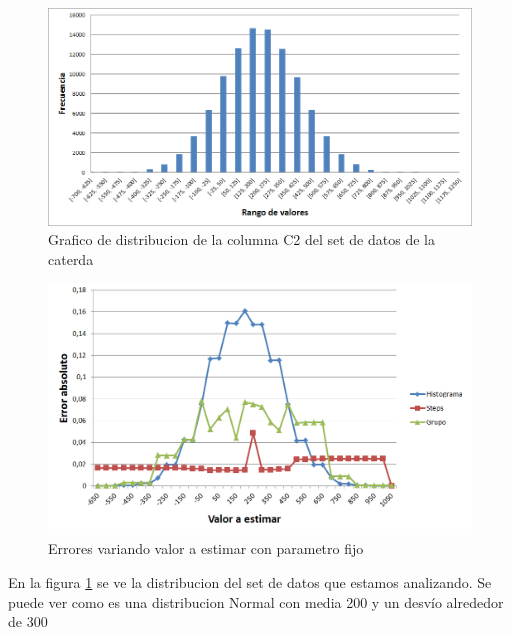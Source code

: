 \documentclass[10pt, a4paper]{article}
\begin{document}
	\begin{figure}[H]
	  \begin{center}
	    \includegraphics[scale=.50]{imagenes/distro_C2.png}
	    \caption{Grafico de distribucion de la columna C2 del set de datos de la caterda} 
	    \label{fig:(distro_C2}
	  \end{center}
	\end{figure}

		\newpage					
	\begin{figure}[H]
	  \begin{center}
	    \includegraphics[scale=.40]{imagenes/C2_variando_valor.png}
	    \caption{Errores variando valor a estimar con parametro fijo} 
	    \label{fig:C2_variando_valor}
	  \end{center}
	\end{figure}
		
		En la figura \ref{fig:(distro_C2} se ve la distribucion del set de datos que estamos analizando. Se puede ver como es una distribucion Normal con media 200 y un desv\'io alrededor de 300
		
\end{document}
